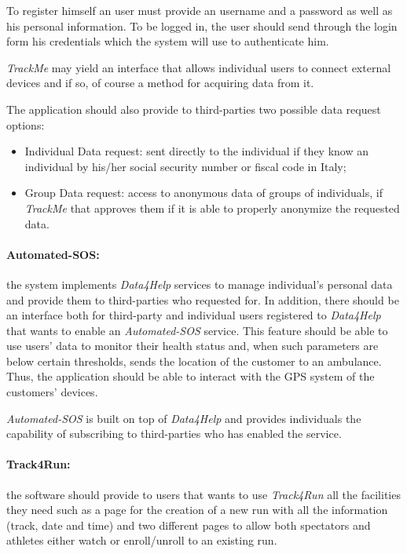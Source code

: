 \documentclass[a4paper]{article}
\begin{document}
    To register himself an user must provide an username and a password as well as his personal information. To be logged in, the user should send through the login form his credentials which the system will use to authenticate him.
    
    \textit{TrackMe} may yield an interface that allows individual users to connect external devices and if so, of course a method for acquiring data from it.
    
    The application should also provide to third-parties two possible data request options:
    \begin{itemize}
        \item Individual Data request: sent directly to the individual if they know an  individual by his/her social security number or fiscal code in Italy;
        \item Group Data request: access  to  anonymous  data  of  groups  of  individuals, if \textit{TrackMe}  that  approves  them  if  it  is  able  to  properly  anonymize  the  requested  data.
    \end{itemize}
    
    \paragraph{Automated-SOS:} the system implements \textit{Data4Help} services to manage individual's personal data and provide them to third-parties who requested for. In addition, there should be an interface both for third-party and individual users registered to \textit{Data4Help} that wants to enable an \textit{Automated-SOS} service. This feature should be able to use users' data to monitor their health status and, when such parameters are below certain thresholds, sends the location of the customer to an ambulance. Thus, the application should be able to interact with the GPS system of the customers' devices.
    
    \textit{Automated-SOS} is built on top of \textit{Data4Help} and provides individuals the capability of subscribing to third-parties who has enabled the service.
    
    \paragraph{Track4Run: } the software should provide to users that wants to use \textit{Track4Run} all the facilities they need such as a page for the creation of a new run with all the information (track, date and time) and two different pages to allow both spectators and athletes either watch or enroll/unroll to an existing run.
    
\end{document}
